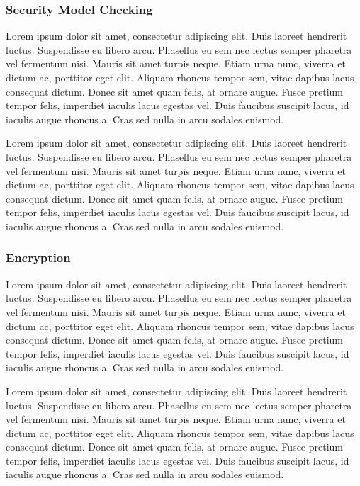 \documentclass[final,conference,11pt]{IEEEtran}
\begin{document}
\subsubsection{Security Model Checking}

Lorem ipsum dolor sit amet, consectetur adipiscing elit. Duis laoreet hendrerit luctus. Suspendisse eu libero arcu. Phasellus eu sem nec lectus semper pharetra vel fermentum nisi. Mauris sit amet turpis neque. Etiam urna nunc, viverra et dictum ac, porttitor eget elit. Aliquam rhoncus tempor sem, vitae dapibus lacus consequat dictum. Donec sit amet quam felis, at ornare augue. Fusce pretium tempor felis, imperdiet iaculis lacus egestas vel. Duis faucibus suscipit lacus, id iaculis augue rhoncus a. Cras sed nulla in arcu sodales euismod.

Lorem ipsum dolor sit amet, consectetur adipiscing elit. Duis laoreet hendrerit luctus. Suspendisse eu libero arcu. Phasellus eu sem nec lectus semper pharetra vel fermentum nisi. Mauris sit amet turpis neque. Etiam urna nunc, viverra et dictum ac, porttitor eget elit. Aliquam rhoncus tempor sem, vitae dapibus lacus consequat dictum. Donec sit amet quam felis, at ornare augue. Fusce pretium tempor felis, imperdiet iaculis lacus egestas vel. Duis faucibus suscipit lacus, id iaculis augue rhoncus a. Cras sed nulla in arcu sodales euismod.

\subsubsection{Encryption}
Lorem ipsum dolor sit amet, consectetur adipiscing elit. Duis laoreet hendrerit luctus. Suspendisse eu libero arcu. Phasellus eu sem nec lectus semper pharetra vel fermentum nisi. Mauris sit amet turpis neque. Etiam urna nunc, viverra et dictum ac, porttitor eget elit. Aliquam rhoncus tempor sem, vitae dapibus lacus consequat dictum. Donec sit amet quam felis, at ornare augue. Fusce pretium tempor felis, imperdiet iaculis lacus egestas vel. Duis faucibus suscipit lacus, id iaculis augue rhoncus a. Cras sed nulla in arcu sodales euismod.

Lorem ipsum dolor sit amet, consectetur adipiscing elit. Duis laoreet hendrerit luctus. Suspendisse eu libero arcu. Phasellus eu sem nec lectus semper pharetra vel fermentum nisi. Mauris sit amet turpis neque. Etiam urna nunc, viverra et dictum ac, porttitor eget elit. Aliquam rhoncus tempor sem, vitae dapibus lacus consequat dictum. Donec sit amet quam felis, at ornare augue. Fusce pretium tempor felis, imperdiet iaculis lacus egestas vel. Duis faucibus suscipit lacus, id iaculis augue rhoncus a. Cras sed nulla in arcu sodales euismod.
\end{document}
